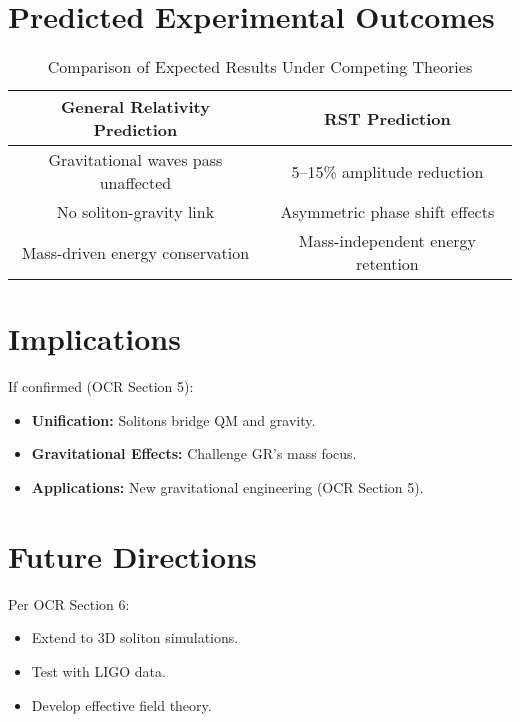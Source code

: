 \documentclass{article}
\begin{document}
\section{Predicted Experimental Outcomes}
\begin{table}[h]
    \centering
    \begin{tabular}{|c|c|}
        \hline
        \textbf{General Relativity Prediction} & \textbf{RST Prediction} \\
        \hline
        Gravitational waves pass unaffected & 5–15\% amplitude reduction \\
        No soliton-gravity link & Asymmetric phase shift effects \\
        Mass-driven energy conservation & Mass-independent energy retention \\
        \hline
    \end{tabular}
    \caption{Comparison of Expected Results Under Competing Theories}
    \label{tab:predictions}
\end{table}

\section{Implications}
If confirmed (OCR Section 5):
\begin{itemize}
    \item \textbf{Unification:} Solitons bridge QM and gravity.
    \item \textbf{Gravitational Effects:} Challenge GR’s mass focus.
    \item \textbf{Applications:} New gravitational engineering (OCR Section 5).
\end{itemize}

\section{Future Directions}
Per OCR Section 6:
\begin{itemize}
    \item Extend to 3D soliton simulations.
    \item Test with LIGO data.
    \item Develop effective field theory.
\end{itemize}
\end{document}
